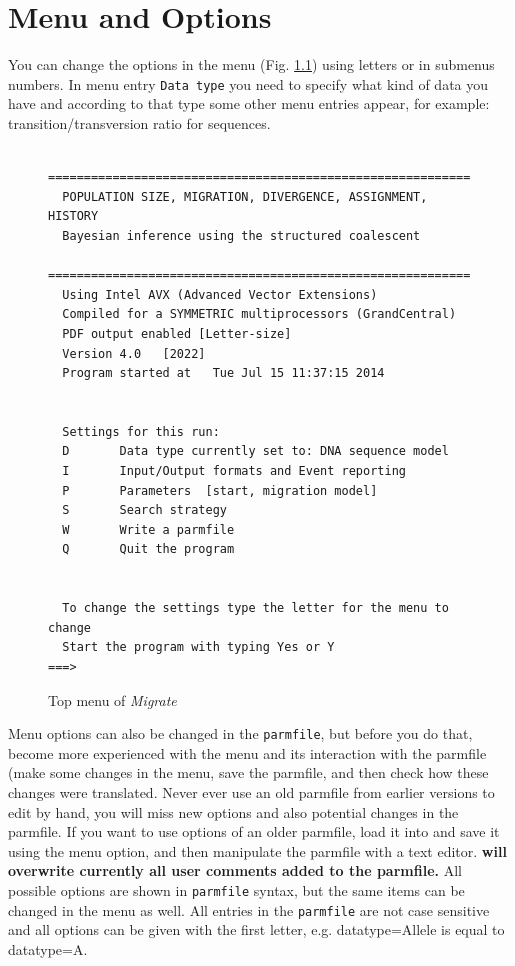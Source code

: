 \chapter {Menu and Options}
You can change the options in the menu (Fig. \ref{TOPM}) using letters or in submenus numbers. 
In menu entry {\tt Data type} you need to specify what kind of data you have and according
to that type some other menu entries appear, for example:  transition/transversion ratio for sequences.\\

\begin{figure}[bht]

\begin{center}

\begin{boxedminipage}[t]{5.2in}
\begin{small}
\begin{verbatim}
 ===========================================================
  POPULATION SIZE, MIGRATION, DIVERGENCE, ASSIGNMENT, HISTORY
  Bayesian inference using the structured coalescent
  ===========================================================
  Using Intel AVX (Advanced Vector Extensions)
  Compiled for a SYMMETRIC multiprocessors (GrandCentral)
  PDF output enabled [Letter-size]
  Version 4.0   [2022]
  Program started at   Tue Jul 15 11:37:15 2014


  Settings for this run:
  D       Data type currently set to: DNA sequence model            
  I       Input/Output formats and Event reporting
  P       Parameters  [start, migration model]
  S       Search strategy
  W       Write a parmfile
  Q       Quit the program


  To change the settings type the letter for the menu to change
  Start the program with typing Yes or Y
===> 
\end{verbatim}
\end{small}
\end{boxedminipage}
\end{center}
\caption{{\sf Top menu of {\it Migrate}}}
\label{TOPM}
\end{figure}
Menu options can also be changed in the {\tt parmfile}, but before you do that, become more experienced with the
menu and its interaction with the parmfile (make some changes in the menu, save the parmfile, and then check
how these changes were translated. Never ever use an old parmfile from earlier versions to edit by hand, you will miss
new options and also potential changes in the parmfile. If you want to use options of an older parmfile, load it into \migrate
and save it using the menu option, and then manipulate the parmfile with a text editor. \textbf{\migrate will overwrite currently all
user comments added to the parmfile.}
All possible options are shown in {\tt parmfile} syntax, but the same items can 
be changed in the menu as well. All entries in the {\tt parmfile} 
are not case sensitive and all options
can be given with the first letter, e.g. datatype=Allele is equal to 
datatype=A. 
\newpage
